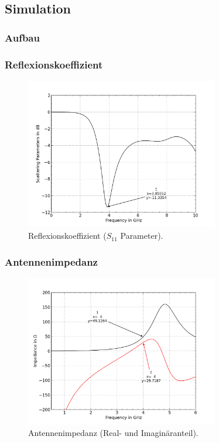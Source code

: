 \subsection{Simulation}

\subsubsection{Aufbau}

\newpage
\subsubsection{Reflexionskoeffizient}

\begin{figure}[h!]
	\centering
	\includegraphics[width=0.75\textwidth]{../fig/plt/monopol_a_sim_s11.png}
	\caption{Reflexionskoeffizient ($S_{11}$ Parameter).}
\end{figure}

\newpage
\subsubsection{Antennenimpedanz}

\begin{figure}[h!]
	\centering
	\includegraphics[width=0.75\textwidth]{../fig/plt/monopol_a_sim_impedance.png}
	\caption{Antennenimpedanz (Real- und Imaginäranteil).}
\end{figure}

